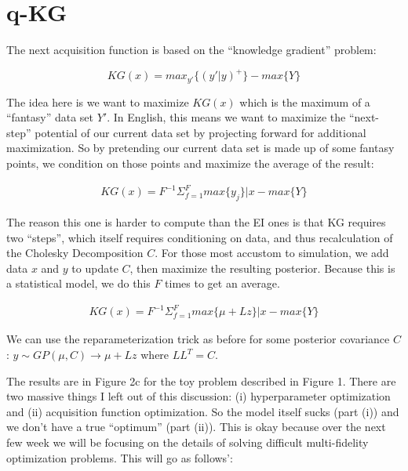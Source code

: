\documentclass[12pt]{article}
\begin{document}
\section{q-KG}

The next acquisition function is based on the ``knowledge gradient'' problem:

\begin{equation}
KG(x)=max_{y'}\{(y' | y)^+\} - max\{Y\}
\end{equation}

\vspace{5mm}

The idea here is we want to maximize $KG(x)$ which is the maximum of a ``fantasy'' data set $Y'$. In English, this means we want to maximize the ``next-step'' potential of our current data set by projecting forward for additional maximization. So by pretending our current data set is made up of some fantasy points, we condition on those points and maximize the average of the result:

\begin{align*}
KG(x)=F^{-1} \Sigma_{f=1}^F max\{y_j\} | x - max\{Y\}
\end{align*}

\vspace{5mm}

The reason this one is harder to compute than the EI ones is that KG requires two ``steps'', which itself requires conditioning on data, and thus recalculation of the Cholesky Decomposition $C$. For those most accustom to simulation, we add data $x$ and $y$ to update $C$, then maximize the resulting posterior. Because this is a statistical model, we do this $F$ times to get an average. 

\begin{align*}
KG(x)=F^{-1} \Sigma_{f=1}^F max\{\mu + Lz\} | x - max\{Y\}
\end{align*}

\vspace{5mm}

We can use the reparameterization trick as before for some posterior covariance $C$: $y \sim GP(\mu,C) \rightarrow \mu + Lz$ where $LL^T=C$.

\vspace{5mm}

The results are in Figure 2c for the toy problem described in Figure 1. There are two massive things I left out of this discussion: (i) hyperparameter optimization and (ii) acquisition function optimization. So the model itself sucks (part (i)) and we don't have a true ``optimum'' (part (ii)). This is okay because over the next few week we will be focusing on the details of solving difficult multi-fidelity optimization problems. This will go as follows':
\end{document}
